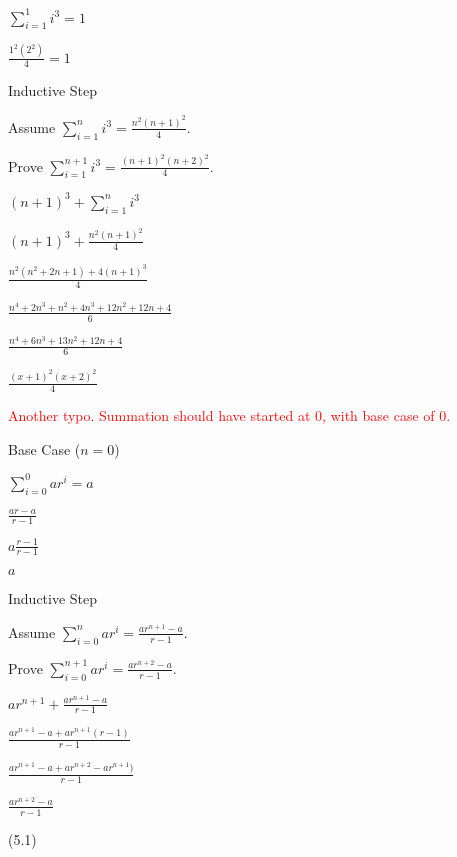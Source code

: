 \documentclass{exam}
\begin{document}
\begin{questions}
\begin{subparts}
\begin{center}
\(\sum_{i=1}^{1} i^3 = 1\)

\(\frac{1^2(2^2)}{4} = 1\)
\vspace{5px}

Inductive Step

Assume \( \sum_{i=1}^{n} i^3 = \frac{n^2(n+1)^2}{4} \). 

Prove \(  \sum_{i=1}^{n+1} i^3 = \frac{(n+1)^2(n+2)^2}{4} \).

\( (n+1)^3 + \sum_{i=1}^{n} i^3 \)

\( (n+1)^3 + \frac{n^2(n+1)^2}{4} \)

\(  \frac{n^2(n^2+2n+1) + 4(n+1)^3}{4} \)

\(  \frac{n^4+2n^3+n^2+4n^3+12n^2+12n+4}{6} \)

\(  \frac{n^4+6n^3+13n^2+12n+4}{6} \)

\(  \frac{(x+1)^2(x+2)^2}{4} \)

\end{center}



\begin{center}

\textcolor{red}{Another typo. Summation should have started at 0, with base case of 0.}

Base Case (\(n = 0\))

\(\sum_{i=0}^{0} ar^i = a\)

\(\frac{ar - a}{r-1}\)

\(a\frac{r-1}{r-1}\)

\(a\)
\vspace{5px}

Inductive Step

Assume \( \sum_{i=0}^{n} ar^i = \frac{ar^{n+1} - a}{r-1} \). 

Prove \( \sum_{i=0}^{n+1} ar^i = \frac{ar^{n+2} - a}{r-1} \).

\( ar^{n+1} + \frac{ar^{n+1} - a}{r-1} \)

\( \frac{ar^{n+1} - a + ar^{n+1}(r-1) }{r-1} \)

\( \frac{ar^{n+1} - a + ar^{n+2} -  ar^{n+1}) }{r-1} \)

\( \frac{ar^{n+2} - a }{r-1} \)


\end{center}

\end{subparts}

 (5.1)


\end{questions}
\end{document}
